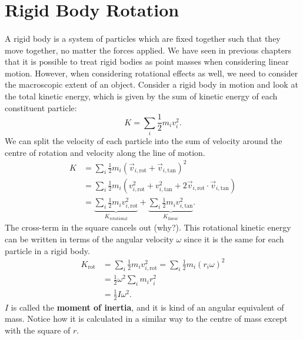 \documentclass[../classical_mechanics.tex]{subfiles}
\begin{document}
    \section{Rigid Body Rotation}
        \paragraph{}
        A rigid body is a system of particles which are fixed together such that they move together, no matter the forces applied.
        We have seen in previous chapters that it is possible to treat rigid bodies as point masses when considering linear motion.
        However, when considering rotational effects as well, we need to consider the macroscopic extent of an object.
        Consider a rigid body in motion and look at the total kinetic energy, which is given by the sum of kinetic energy of each constituent particle:
        \begin{equation}
            K=\sum_i\frac{1}{2}m_iv_i^2.
        \end{equation}
        We can split the velocity of each particle into the sum of velocity around the centre of rotation and velocity along the line of motion.
        \begin{align}
            K&=\sum_i\frac{1}{2}m_i(\vec{v}_{i,\text{rot}}+\vec{v}_{i,\text{tan}})^2\\
            &=\sum_i\frac{1}{2}m_i(v_{i,\text{rot}}^2+v_{i,\text{tan}}^2+2\vec{v}_{i,\text{rot}}\cdot\vec{v}_{i,\text{tan}})\\
            &=\underbrace{\sum_i\frac{1}{2}m_iv_{i,\text{rot}}^2}_{K_\text{rotational}}+\underbrace{\sum_i\frac{1}{2}m_iv_{i,\text{tan}}^2}_{K_\text{linear}}.
        \end{align}
        The cross-term in the square cancels out (why?).
        This rotational kinetic energy can be written in terms of the angular velocity $\omega$ since it is the same for each particle in a rigid body.
        \begin{align}
            K_\text{rot}&=\sum_i\frac{1}{2}m_iv_{i,\text{rot}}^2=\sum_i\frac{1}{2}m_i(r_i\omega)^2\\
            &=\frac{1}{2}\omega^2\sum_i m_ir_i^2\\
            &=\frac{1}{2}I\omega^2.
        \end{align}
        $I$ is called the \textbf{moment of inertia}, and it is kind of an angular equivalent of mass.
        Notice how it is calculated in a similar way to the centre of mass except with the square of $r$.
\end{document}
